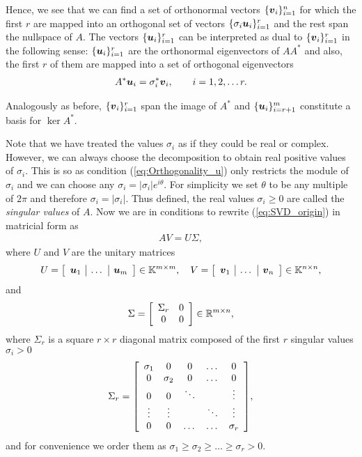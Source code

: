    Hence, we see that we can find a set of orthonormal vectors $\{\boldsymbol{v}_i\}_{i=1}^{n}$ for which the first $r$ are mapped into an 
   orthogonal set of vectors $\{\sigma_i\boldsymbol{u}_i\}_{i=1}^{r}$ and the rest span the nullspace of $A$. The vectors 
   $\{\boldsymbol{u}_i\}_{i=1}^{r}$ can be interpreted as dual to $\{\boldsymbol{v}_i\}_{i=1}^{r}$ in the following sense: $\{\boldsymbol{u}_i\}_{i=1}^{r}$ are 
   the orthonormal eigenvectors of $A A^*$ and also, the first $r$ of them are mapped into a set of orthogonal eigenvectors 
   \begin{align}
   	A^* \boldsymbol{u}_i = \sigma_i^*\boldsymbol{v}_i , \qquad
   	i = 1,2,\ldots r.
   	\label{eq:SVD_dual}
   \end{align}
   
   Analogously as before, $\{\boldsymbol{v}_i\}_{i=1}^{r}$ span the image of $A^*$ and $\{\boldsymbol{u}_i\}_{i=r+1}^{m}$ constitute a basis for $\ker 
   A^{*}$.
   
   Note that we have treated the values $\sigma_i$ as if they could be real or complex. However, we can always choose the decomposition to 
   obtain real positive values of $\sigma_i$. This is so as condition (\ref{eq:Orthogonality_u}) only restricts the module of $\sigma_i$ and 
   we can choose any $\sigma_i = |\sigma_i| e^{i\theta}$. For simplicity we set $\theta$ to be any multiple of $2\pi$ and therefore $\sigma_i 
   = |\sigma_i|$. Thus defined, the real values $\sigma_i \geq 0$ are called the \textit{singular values} of $A$. Now we are in conditions to 
   rewrite (\ref{eq:SVD_origin}) in matricial form as
   \begin{align}
   	AV = U \Sigma,
   \end{align}
   where $U$ and $V$ are the unitary matrices
   \begin{align}
   	U=
   	\Matrix{c|c|c}
   	{
   		\vect{u}_1 &
   		\dots&
   		\vect{u}_{m}
   	}\in\K{m\times m}
   ,\quad
       V=
       \Matrix{c|c|c}
       {
       	\vect{v}_1 &
       	\dots&
       	\vect{v}_{n}
       }\in\K{n\times n},
   \end{align}
   and
   \begin{align}
   	\Sigma =
   	\Matrix{cc}
   	{
   		\Sigma_{r} & 0  \\ 
   		0 & 0
   	}
   \in \R{m\times n},
   \end{align}
   where $\Sigma_{r}$ is a square $r\times r$ diagonal matrix composed of the first $r$ singular values $\sigma_i > 0$
   \begin{align}
   	\Sigma_r =
   	\Matrix{ccccc}
   	{
   		\sigma_{1} & 0 & 0 & \dots &0  \\ 
   		0          & \sigma_{2} & 0 & \dots &0 \\
   		0          & 0 & \ddots &  & \vdots \\
   		\vdots          & \vdots & & \ddots  & \vdots
   		\\
   		0          & 0 & \dots & \dots & \sigma_r
   	},
   \end{align} 
   and for convenience we order them as $\sigma_{1}\geq\sigma_{2}\geq\dots\geq\sigma_{r}> 0 $.
   

